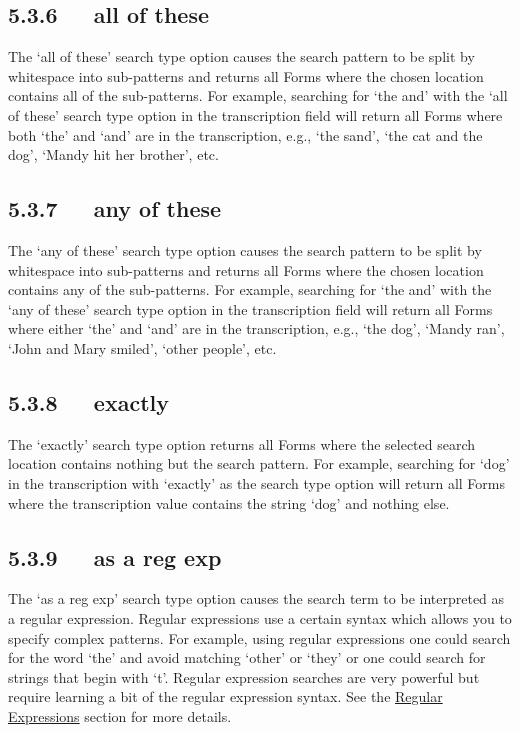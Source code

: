 \documentclass[letterpaper,10pt,english]{sphinxmanual}
\begin{document}
\subsection{5.3.6   all of these}
\label{user_guide:all-of-these}
The `all of these' search type option causes the search pattern to be split by
whitespace into sub-patterns and returns all Forms where the chosen location
contains all of the sub-patterns.  For example, searching for `the and' with the
`all of these' search type option in the transcription field will return all
Forms where both `the' and `and' are in the transcription, e.g., `the sand',
`the cat and the dog', `Mandy hit her brother', etc.


\subsection{5.3.7   any of these}
\label{user_guide:any-of-these}
The `any of these' search type option causes the search pattern to be split by
whitespace into sub-patterns and returns all Forms where the chosen location
contains any of the sub-patterns.  For example, searching for `the and' with the
`any of these' search type option in the transcription field will return all
Forms where either `the' and `and' are in the transcription, e.g., `the dog',
`Mandy ran', `John and Mary smiled', `other people', etc.


\subsection{5.3.8   exactly}
\label{user_guide:exactly}
The `exactly' search type option returns all Forms where the selected search
location contains nothing but the search pattern.  For example, searching for
`dog' in the transcription with `exactly' as the search type option will return
all Forms where the transcription value contains the string `dog' and nothing
else.


\subsection{5.3.9   as a reg exp}
\label{user_guide:as-a-reg-exp}
The `as a reg exp' search type option causes the search term to be interpreted
as a regular expression.  Regular expressions use a certain syntax which allows
you to specify complex patterns.  For example, using regular expressions one
could search for the word `the' and avoid matching `other' or `they' or one
could search for strings that begin with `t'.  Regular expression searches are
very powerful but require learning a bit of the regular expression syntax.  See
the {\hyperref[user_guide:regular-expressions]{Regular Expressions}} section for more details.
\end{document}
